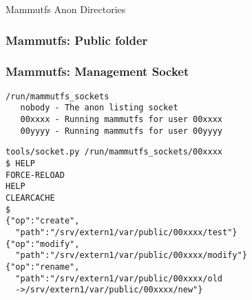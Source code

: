 \documentclass{beamer}
\newcommand\tikzbox[5]{%
      \draw (#1, #2) -- +(0, #4) -- +(#3, #4) -- +(#3, 0) -- +(0, 0) node[align=left,right] at +(0,#4/2) {#5}
}
\newcommand\raidbox[5]{%
  \tikzbox{#1}{#2}{#3}{#4}{
    \normalsize\texttt{#5} \\
    \tiny\texttt{   backup} \\
    \tiny\texttt{   var/anonym} \\
    \tiny\texttt{   var/public} \\
    \tiny\texttt{   var/private}}
}
\begin{document}
\begin{frame}{Mammutfs Anon Directories}
    \frametitle{Mammutfs: Public folder}
\end{frame}

\begin{frame}[fragile]
    \frametitle{Mammutfs: Management Socket}

    \begin{lstlisting}
/run/mammutfs_sockets
   nobody - The anon listing socket
   00xxxx - Running mammutfs for user 00xxxx
   00yyyy - Running mammutfs for user 00yyyy
 \end{lstlisting}
 
    \vspace{1cm}

    \begin{lstlisting}
tools/socket.py /run/mammutfs_sockets/00xxxx
$ HELP
FORCE-RELOAD
HELP
CLEARCACHE
$
{"op":"create",
  "path":"/srv/extern1/var/public/00xxxx/test"}
{"op":"modify",
  "path":"/srv/extern1/var/public/00xxxx/modify"}
{"op":"rename",
  "path":"/srv/extern1/var/public/00xxxx/old
  ->/srv/extern1/var/public/00xxxx/new"}
    \end{lstlisting}
\end{frame}
\end{document}
